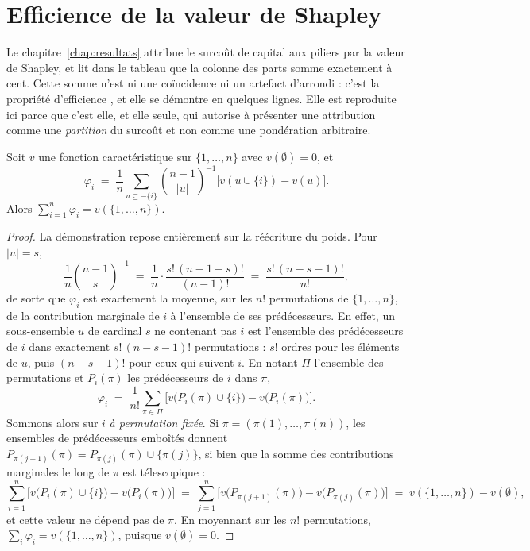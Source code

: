 \section*{Efficience de la valeur de Shapley}
\label{sec:ann-efficience-shapley}

Le chapitre~\ref{chap:resultats} attribue le surcoût de capital aux piliers par la valeur de
Shapley, et lit dans le tableau que la colonne des parts somme exactement à cent. Cette somme
n'est ni une coïncidence ni un artefact d'arrondi : c'est la propriété d'efficience
\citep{Shapley1953}, et elle se démontre en quelques lignes. Elle est reproduite ici parce que
c'est elle, et elle seule, qui autorise à présenter une attribution comme une \emph{partition} du
surcoût et non comme une pondération arbitraire.

\begin{proposition}[Efficience]
\label{prop:efficience}
Soit $v$ une fonction caractéristique sur $\{1,\dots,n\}$ avec $v(\emptyset)=0$, et
\[
  \varphi_i \;=\; \frac1n \sum_{u \subseteq -\{i\}} \binom{n-1}{|u|}^{-1}
                  \bigl[v(u \cup \{i\}) - v(u)\bigr].
\]
Alors $\sum_{i=1}^{n} \varphi_i = v(\{1,\dots,n\})$.
\end{proposition}

\begin{proof}
La démonstration repose entièrement sur la réécriture du poids. Pour $|u|=s$,
\begin{equation}
  \frac1n \binom{n-1}{s}^{-1} \;=\; \frac1n \cdot \frac{s!\,(n-1-s)!}{(n-1)!}
  \;=\; \frac{s!\,(n-s-1)!}{n!},
  \label{eq:poids-shapley}
\end{equation}
de sorte que $\varphi_i$ est exactement la moyenne, sur les $n!$ permutations de
$\{1,\dots,n\}$, de la contribution marginale de $i$ à l'ensemble de ses prédécesseurs. En effet,
un sous-ensemble $u$ de cardinal $s$ ne contenant pas $i$ est l'ensemble des prédécesseurs de $i$
dans exactement $s!\,(n-s-1)!$ permutations : $s!$ ordres pour les éléments de $u$, puis
$(n-s-1)!$ pour ceux qui suivent $i$. En notant $\Pi$ l'ensemble des permutations et $P_i(\pi)$
les prédécesseurs de $i$ dans $\pi$,
\[
  \varphi_i \;=\; \frac{1}{n!} \sum_{\pi \in \Pi}
              \bigl[v\bigl(P_i(\pi) \cup \{i\}\bigr) - v\bigl(P_i(\pi)\bigr)\bigr].
\]
Sommons alors sur $i$ \emph{à permutation fixée}. Si $\pi = (\pi(1),\dots,\pi(n))$, les
ensembles de prédécesseurs emboîtés donnent
$P_{\pi(j+1)}(\pi) = P_{\pi(j)}(\pi) \cup \{\pi(j)\}$, si bien que la somme des contributions
marginales le long de $\pi$ est télescopique :
\[
  \sum_{i=1}^{n} \bigl[v\bigl(P_i(\pi)\cup\{i\}\bigr)-v\bigl(P_i(\pi)\bigr)\bigr]
  \;=\; \sum_{j=1}^{n} \bigl[v\bigl(P_{\pi(j+1)}(\pi)\bigr)-v\bigl(P_{\pi(j)}(\pi)\bigr)\bigr]
  \;=\; v(\{1,\dots,n\}) - v(\emptyset),
\]
et cette valeur ne dépend pas de $\pi$. En moyennant sur les $n!$ permutations,
$\sum_i \varphi_i = v(\{1,\dots,n\})$, puisque $v(\emptyset)=0$.
\end{proof}

